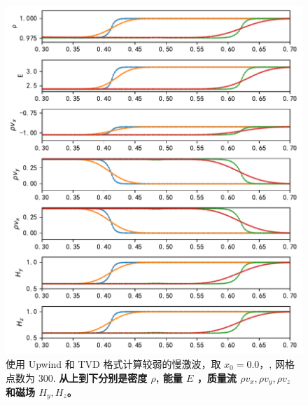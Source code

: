 \documentclass[10.5pt
]{article}
\begin{document}
\begin{figure}[htpb]
	\centering
	\includegraphics[width=\textwidth]{figures/case1_fast_upwind_TVD.pdf}
	\caption{使用 Upwind 和 TVD 格式计算较弱的慢激波，取 \(x_0 = 0.0，\), 网格点数为 300. \textbf{从上到下分别是密度 $\rho$, 能量 $E$ ，质量流 $\rho v_x, \rho v_y, \rho v_z$ 和磁场 $H_y, H_z$。}
	}%
	\label{fig:upwind_tvd_1}
\end{figure}
\end{document}
